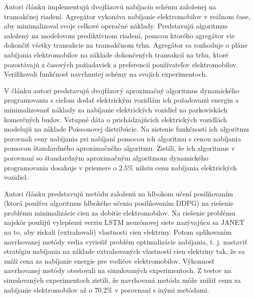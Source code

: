 % 

Autori článku \cite{two-stage-optimal-scheduling-liu} implementujú dvojfázovú nabíjaciu schému založenej na transakčnej riadení. Agregátor vykonáva nabíjanie elektromobilov v reálnom čase, aby minimalizoval svoje celkové operačné náklady. Predstavujú algoritmus založený na modelovom prediktívnom riadení, pomcou ktorého agregátor vie dokončiť všetky transakcie na transakčnom trhu. Agregátor sa rozhoduje o pláne nabíjania elektromobilov na základe dokončených transakcií na trhu, ktoré pozostávajú z časových požiadaviek a preferencií používateľov elektromobilov. Verifikovali funkčnosť navrhnutej schémy na svojich experimentoch.




V článku \cite{Zhang2018RealTimeSC} autori predstavujú dvojfázový aproximačný algoritmus dynamického programovania s cieľom dodať elektrickým vozidlám ich požadovanú energiu a minimalizovanť náklady za nabíjanie elektrických vozidiel na parkoviskách komerčných budov. Vstupné dáta o prichádzajúcich elektrických vozidlách modelujú na základe Poissonovej distribúcie. Na zistenie funkčnosti ich algoritmu porovnali ceny nabíjania pri nabíjaní pomocou ich algoritmu s cenou nabíjania pomocou štandardného aproximačného algoritmu. Zistili, že ich algoritmus v porovnaní so štandardným aproximačným algoritmom dynamického programovania dosahuje v priemere o $2.5\%$ nižsiu cenu nabíjania elektrických vozidiel.


Autori článku \cite{rl_costmin_1} predstavujú metódu založenú na hlbokom učení posilňovaním (ktorá používa algoritmus hlbokého učenia posilňovaním DDPG) na riešenie problému minimalizácie cien za dobitie elektromobilov. Na riešenie problému najskôr použijú vylepšenú verziu LSTM neurónovej siete nazývajúcu sa JANET na to, aby získali (extrahovali) vlastnosti cien elektriny. Potom aplikovaním navrhovanej metódy vedia vyriešiť problém optimalizácie nabíjania, t. j. nastaviť stratégiu nabíjania na základe extrahovaných vlastností cien elektriny tak, že sa zníži cena za nabíjanie energie pre vodičov elektromobilov. Výkonnosť navrhovanej metódy otestovali na simulovaných experimentoch. Z testov na simulovaných experimentoch zistili, že navrhovaná metóda môže znížiť cenu za nabíjanie elektromobilov až o 70.2\% v porovnaní s inými metódami. 

